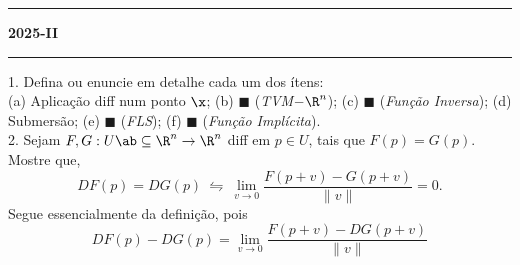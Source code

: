\newcommand{\F}{\mathbb{F}}
\newcommand{\C}{\mathbb{C}}
\newcommand{\an}{\mathscr{A}} 
\newcommand{\Q}{\mathbb{Q}}
\renewcommand{\hom}{\operatorname{Hom}}
\newcommand{\ehom}{\operatorname{End}}

\-\vspace{-0.3cm}
  {\hrule \vspace{-0.15cm}
  \centering \textbf{2025-II} \vspace{0.1cm}
  \hrule}

1. Defina ou enuncie em detalhe cada um dos ítens: \\
(a) Aplicação diff num ponto \(\x\);  %
(b) \(\blacksquare\) (\emph{TVM\(-\R^n\)}); %
(c) \(\blacksquare\) (\emph{Função Inversa}); %
(d) Submersão;  %
(e) \(\blacksquare\) (\emph{FLS});  %
(f) \(\blacksquare\) (\emph{Função Implícita}).\vspace{0.3cm}\\ %
2. Sejam \(F,G: U\ab \subseteq \R^n \to \R^n\) diff em \(p \in U\), tais que \(F(p) = G(p)\). Mostre que,
\[DF(p) = DG(p) \ \leftrightharpoons \ \lim_{v\to 0} \frac{F(p+v) - G(p+v)}{\|v\|} = 0. \]
\textcolor{gris}{
    Segue essencialmente da definição, pois 
    \[DF(p) - DG(p) = \lim_{v\to 0} \frac{F(p+v) -DG(p+v)}{\|v\|}\] 
}
